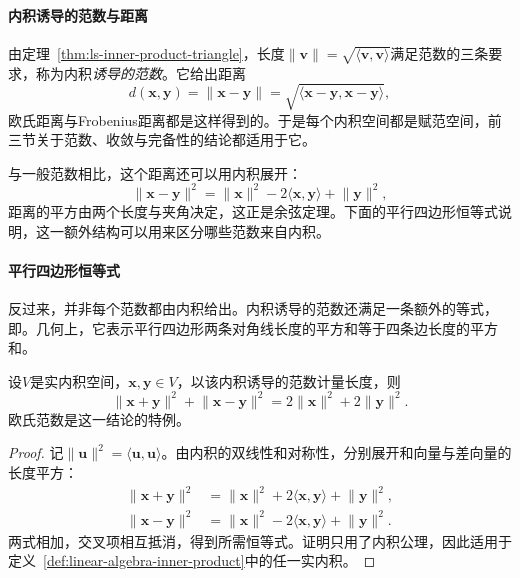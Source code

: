 \paragraph{内积诱导的范数与距离}
由定理~\ref{thm:ls-inner-product-triangle}，长度$\lVert\bm v\rVert=\sqrt{\langle\bm v,\bm v\rangle}$满足范数的三条要求，称为内积\emph{诱导的范数}。它给出距离
\begin{equation}
 d(\bm x,\bm y)=\lVert\bm x-\bm y\rVert=\sqrt{\langle\bm x-\bm y,\bm x-\bm y\rangle},
 \label{eq:ls-inner-product-distance}
\end{equation}
欧氏距离与Frobenius距离都是这样得到的。于是每个内积空间都是赋范空间，前三节关于范数、收敛与完备性的结论都适用于它。

与一般范数相比，这个距离还可以用内积展开：
\[
 \lVert\bm x-\bm y\rVert^2=\lVert\bm x\rVert^2-2\langle\bm x,\bm y\rangle+\lVert\bm y\rVert^2,
\]
距离的平方由两个长度与夹角决定，这正是余弦定理。下面的平行四边形恒等式说明，这一额外结构可以用来区分哪些范数来自内积。

\paragraph{平行四边形恒等式}
反过来，并非每个范数都由内积给出。内积诱导的范数还满足一条额外的等式，即。几何上，它表示平行四边形两条对角线长度的平方和等于四条边长度的平方和。
\begin{theorem}[平行四边形恒等式]
\label{thm:linear-algebra-parallelogram}
设$V$是实内积空间，$\bm x,\bm y\in V$，以该内积诱导的范数计量长度，则
\begin{equation}
 \lVert\bm x+\bm y\rVert^2+\lVert\bm x-\bm y\rVert^2
 =2\lVert\bm x\rVert^2+2\lVert\bm y\rVert^2.
 \label{eq:functional-parallelogram-identity}
\end{equation}
欧氏范数是这一结论的特例。
\end{theorem}
\begin{proof}
记$\lVert\bm u\rVert^2=\langle\bm u,\bm u\rangle$。由内积的双线性和对称性，分别展开和向量与差向量的长度平方：
\[
 \begin{aligned}
 \lVert\bm x+\bm y\rVert^2
 &=\lVert\bm x\rVert^2+2\langle\bm x,\bm y\rangle+\lVert\bm y\rVert^2,\\
 \lVert\bm x-\bm y\rVert^2
 &=\lVert\bm x\rVert^2-2\langle\bm x,\bm y\rangle+\lVert\bm y\rVert^2.
 \end{aligned}
\]
两式相加，交叉项相互抵消，得到所需恒等式。证明只用了内积公理，因此适用于定义~\ref{def:linear-algebra-inner-product}中的任一实内积。
\end{proof}

